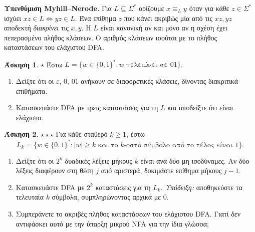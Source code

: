 \documentclass[11pt,a4paper]{article}
\theoremstyle{definition}\newtheorem{question}{Άσκηση}
\newcommand{\eps}{\varepsilon}
\begin{document}
\textbf{Υπενθύμιση Myhill--Nerode.} Για $L\subseteq\Sigma^*$ ορίζουμε $x\equiv_L y$ όταν για κάθε $z\in\Sigma^*$ ισχύει $xz\in L\iff yz\in L$. Ένα επίθημα $z$ που κάνει ακριβώς μία από τις $xz,yz$ αποδεκτή \emph{διακρίνει} τις $x,y$. Η $L$ είναι κανονική αν και μόνο αν η σχέση έχει πεπερασμένο πλήθος κλάσεων. Ο αριθμός κλάσεων ισούται με το πλήθος καταστάσεων του ελάχιστου DFA.

\begin{question}$\star$
Έστω $L=\{w\in\{0,1\}^*:w\text{ τελειώνει σε }01\}$.
\begin{enumerate}
\item Δείξτε ότι οι $\eps$, $0$, $01$ ανήκουν σε διαφορετικές κλάσεις, δίνοντας διακριτικά επιθήματα.
\item Κατασκευάστε DFA με τρεις καταστάσεις για τη $L$ και αποδείξτε ότι είναι ελάχιστο.
\end{enumerate}\end{question}
 

\begin{question} $\star\star\star$
Για κάθε σταθερό $k\geq1$, έστω
\[L_k=\{w\in\{0,1\}^*:|w|\geq k\text{ και το }k\text{-οστό σύμβολο από το τέλος είναι }1\}.\]
\begin{enumerate}
\item Δείξτε ότι οι $2^k$ δυαδικές λέξεις μήκους $k$ είναι ανά δύο μη ισοδύναμες. Αν δύο λέξεις διαφέρουν στη θέση $j$ από αριστερά, δοκιμάστε επίθημα μήκους $j-1$.
\item Κατασκευάστε DFA με $2^k$ καταστάσεις για τη $L_k$. \textit{Υπόδειξη:} αποθηκεύστε τα τελευταία $k$ σύμβολα, συμπληρώνοντας αρχικά με $0$.
\item Συμπεράνετε το ακριβές πλήθος καταστάσεων του ελάχιστου DFA. Γιατί δεν αντιφάσκει αυτό με την ύπαρξη μικρού NFA για την ίδια γλώσσα;
\end{enumerate}\end{question}
\end{document}

